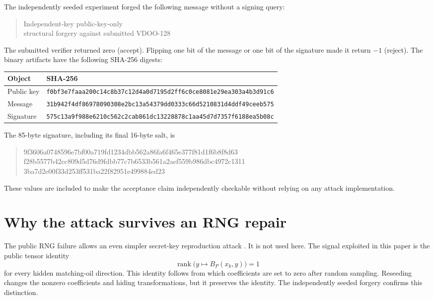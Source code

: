 \documentclass[11pt]{article}
\newcommand{\rank}{\operatorname{rank}}
\newcommand{\code}[1]{\texttt{#1}}
\begin{document}
The independently seeded experiment forged the following message without a
signing query:
\begin{quote}
\small\ttfamily Independent-key public-key-only\\
structural forgery against submitted VDOO-128
\end{quote}
The submitted verifier returned zero (accept).  Flipping one bit of the
message or one bit of the signature made it return $-1$ (reject).  The binary
artifacts have the following SHA-256 digests:
\begin{center}
\small
\begin{tabular}{@{}ll@{}}
\toprule
Object & SHA-256 \\
\midrule
Public key & \code{f0bf3e7faaa200c14c8b37c12d4a0d7195d2ff6c0ce8081e29ea303a4b3d91c6} \\
Message & \code{31b942f4df86978090308e2bc13a54379dd0333c66d5210831d4ddf49ceeb575} \\
Signature & \code{575c13a9f988e6210c562c2cab861dc13228878c1aa45d7d7357f6188ea5b08c} \\
\bottomrule
\end{tabular}
\end{center}
The 85-byte signature, including its final 16-byte salt, is
\begin{quote}
\ttfamily\small\raggedright
9f3606a0748596e7bf00a719fd1234dbb562a86fa6f465e377f81d1f6b8f8d63\\
f28b5577b42cc809d5d76d9fdbb77c7b6533b561a2aef559b986dbc4972c1311\\
3ba7d2e00f33d253ff531ba22f82951e499884ed23
\end{quote}
These values are included to make the acceptance claim independently
checkable without relying on any attack implementation.

\section{Why the attack survives an RNG repair}

The public RNG failure allows an even simpler secret-key reproduction attack
\cite{ngcc-report}.  It is not used here.  The signal exploited in this paper
is the public tensor identity
\[
       \rank\bigl(y\mapsto B_P(x_k,y)\bigr)=1
\]
for every hidden matching-oil direction.  This identity follows from which
coefficients are set to zero after random sampling.  Reseeding changes the
nonzero coefficients and hiding transformations, but it preserves the
identity.  The independently seeded forgery confirms this distinction.
\end{document}
